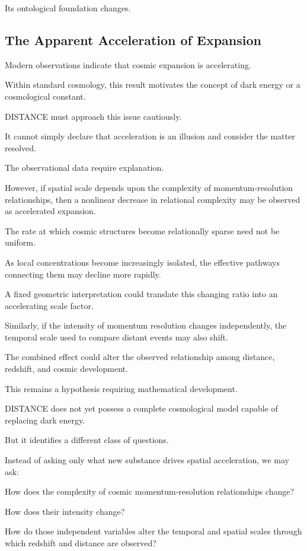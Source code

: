 Its ontological foundation changes.

\subsection*{\textbf{The Apparent Acceleration of Expansion}}

Modern observations indicate that cosmic expansion is accelerating.

Within standard cosmology, this result motivates the concept of dark energy or a cosmological constant.

DISTANCE must approach this issue cautiously.

It cannot simply declare that acceleration is an illusion and consider the matter resolved.

The observational data require explanation.

However, if spatial scale depends upon the complexity of momentum-resolution relationships, then a nonlinear decrease in relational complexity may be observed as accelerated expansion.

The rate at which cosmic structures become relationally sparse need not be uniform.

As local concentrations become increasingly isolated, the effective pathways connecting them may decline more rapidly.

A fixed geometric interpretation could translate this changing ratio into an accelerating scale factor.

Similarly, if the intensity of momentum resolution changes independently, the temporal scale used to compare distant events may also shift.

The combined effect could alter the observed relationship among distance, redshift, and cosmic development.

This remains a hypothesis requiring mathematical development.

DISTANCE does not yet possess a complete cosmological model capable of replacing dark energy.

But it identifies a different class of questions.

Instead of asking only what new substance drives spatial acceleration, we may ask:

How does the complexity of cosmic momentum-resolution relationships change?

How does their intensity change?

How do those independent variables alter the temporal and spatial scales through which redshift and distance are observed?

